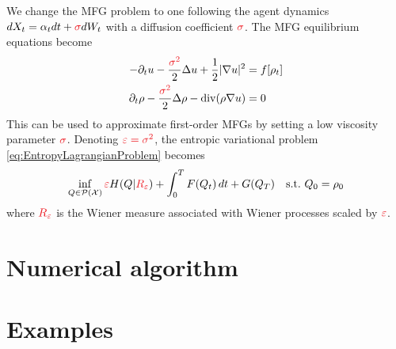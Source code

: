 \documentclass[11pt]{article}
\newcommand{\calP}{\mathcal{P}}
\newcommand{\calX}{\mathcal{X}}
\newcommand{\suchthat}{\mathrm{s.t.}}
\renewcommand{\epsilon}{\varepsilon}
\DeclareMathOperator{\divg}{div}
\numberwithin{equation}{section}
\newcommand{\redfont}{\color{Red}}
\theoremstyle{definition}
\begin{document}
We change the MFG problem to one following the agent dynamics $dX_t = \alpha_t dt + {\redfont\sigma} dW_t$ with a diffusion coefficient $\redfont\sigma$. The MFG equilibrium equations become
\begin{equation}
\begin{aligned}
	-\partial_t u - \frac{\redfont\sigma^2}{2}\Delta u + \frac12 |\nabla u|^2 &= f[\rho_t] \\
	\partial_t \rho - \frac{\redfont\sigma^2}{2}\Delta\rho - \divg(\rho\nabla u) &= 0
\end{aligned}	
\end{equation}
This can be used to approximate first-order MFGs by setting a low viscosity parameter $\redfont\sigma$.
Denoting $\redfont\epsilon = \sigma^2$, the entropic variational problem \eqref{eq:EntropyLagrangianProblem} becomes
\begin{equation}
	\inf_{Q\in\calP(\calX)}
	{\redfont\epsilon} H(Q|{\redfont R_{\epsilon}}) + \int_0^T F(Q_t)\,dt + G(Q_T)\quad
	\suchthat\ Q_0 = \rho_0
\end{equation}
where $\redfont R_{\epsilon}$ is the Wiener measure associated with Wiener processes scaled by $\redfont\epsilon$.

\section{Numerical algorithm}





\section{Examples}






\printbibliography{}
\end{document}

